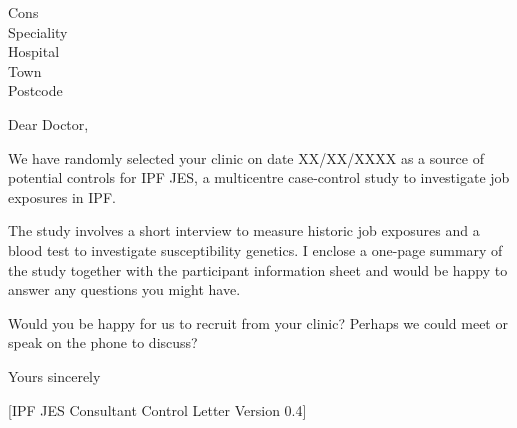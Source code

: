 \documentclass[ipfjes-centre,letterpaper,pagesize,UScommercial9]{scrlttr2}
\begin{document}
\begin{letter}{Cons \\ Speciality \\ Hospital \\ Town \\ Postcode}


\opening{Dear Doctor,}

    We have randomly selected your clinic on date XX/XX/XXXX as a source of potential controls for IPF JES, a multicentre case-control study to investigate job exposures in IPF.
    
    The study involves a short interview to measure historic job exposures and a blood test to investigate susceptibility genetics. I enclose a one-page summary of the study together with the participant information sheet and would be happy to answer any questions you might have.
    
    Would you be happy for us to recruit from your clinic? Perhaps we could meet or speak on the phone to discuss?


\closing{Yours sincerely}

     \vfill \hfill [IPF JES Consultant Control Letter Version 0.4]

\end{letter}
\end{document}
